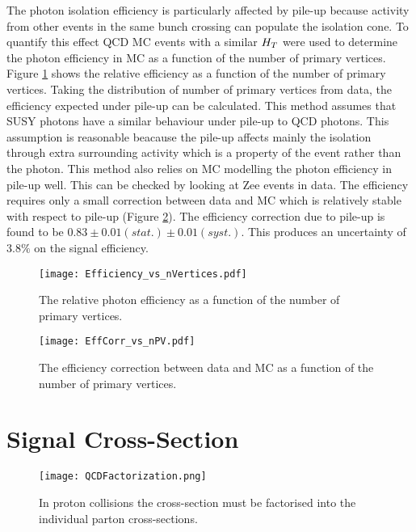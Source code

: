 The photon isolation efficiency is particularly affected by pile-up because
activity from other events in the same bunch crossing can populate the isolation
cone. To quantify this effect QCD MC events with a similar $H_{T}$ were used to
determine the photon efficiency in MC as a function of the number of primary
vertices. Figure \ref{fig:Efficiency_vs_nVertices} shows the relative efficiency
as a function of the number of primary vertices. Taking the distribution of 
number of primary vertices from data, the efficiency expected under pile-up can 
be calculated. This method assumes that SUSY photons have a similar behaviour 
under pile-up to QCD photons. This assumption is reasonable beacause the pile-up 
affects mainly the isolation through extra surrounding activity which is a 
property of the event rather than the photon. This method also relies on MC 
modelling the photon efficiency in pile-up well. This can be checked by looking 
at Zee events in data. The efficiency requires only a small correction between 
data and MC which is relatively stable with respect to pile-up (Figure 
\ref{fig:EffCorr_vs_nPV}). The efficiency correction due to pile-up is found to 
be $0.83\pm0.01(stat.)\pm0.01(syst.)$. This produces an uncertainty of
$3.8\unit{\%}$ on the signal efficiency.

\begin{figure}
\begin{center}
\texttt{[image: Efficiency\_vs\_nVertices.pdf]}
\end{center}
\caption{The relative photon efficiency as a function of the number of primary 
vertices.}
\label{fig:Efficiency_vs_nVertices}
\end{figure}

\begin{figure}
\begin{center}
\texttt{[image: EffCorr\_vs\_nPV.pdf]}
\end{center}
\caption{The efficiency correction between data and MC as a function of the
number of primary vertices.}
\label{fig:EffCorr_vs_nPV}
\end{figure}

\section{Signal Cross-Section}
\label{sec:xsec}

\begin{figure}
\begin{center}
\texttt{[image: QCDFactorization.png]}
\end{center}
\caption{In proton collisions the cross-section must be factorised into the 
individual parton cross-sections.}
\label{fig:QCDFactorization}
\end{figure}

